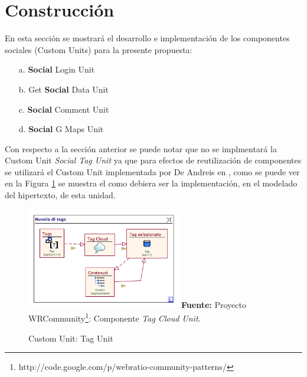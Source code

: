 \documentclass[oneside,12pt,a4paper]{memoir}%
\begin{document}
	\section{Construcci\'on}
	\label{sec:construction}
	En esta secci\'on se mostrar\'a el desarrollo e implementaci\'on de los
	componentes sociales (Custom Units) para la presente propuesta:
	
	\begin{itemize}
	  \item[a.] \textbf{Social} Login Unit
	  \item[b.] Get \textbf{Social} Data Unit
	  \item[c.] \textbf{Social} Comment Unit
	  \item[d.] \textbf{Social} G Maps Unit
	\end{itemize}
	
	Con respecto a la secci\'on anterior se puede notar que no se implmentar\'a la
	Custom Unit \textit{Social Tag Unit} ya que para efectos de reutilizaci\'on de
	componentes se utilizar\'a el Custom Unit implementada por De Andreis en
	\cite{Andreis2010}, como se puede ver en la Figura \ref{fig:NuvulaDiTags} se
	muestra el como debiera ser la implementaci\'on, en el modelado del hipertexto,
	de esta unidad.
		
		\begin{figure}[here]
			\centering 
			\caption{Custom Unit: Tag Unit}
			\includegraphics[width=0.6\textwidth]{figure/fig_NuvulaDiTags.png}
			\newline
			\textbf{Fuente:} Proyecto
			WRCommunity\footnote{http://code.google.com/p/webratio-community-patterns/}:
			Componente \textit{Tag Cloud Unit}.
			\label{fig:NuvulaDiTags}
		\end{figure}
\end{document}
